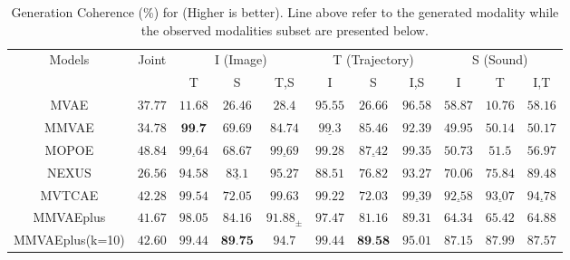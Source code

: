\begin{table}[ht]
\centering
\tiny
\caption{Generation Coherence (\%) for \textbf{\mhd} (Higher is better). Line above refer to the generated modality while the observed modalities subset are presented below.
}  

\begin{tabular}{c|c|ccc|ccc|ccc}
\toprule
\multirow{2}{*}{ Models }  & \multirow{2}{*}{ Joint }  & \multicolumn{3}{c}{I (Image)}  & \multicolumn{3}{c}{T (Trajectory)}  & \multicolumn{3}{c}{S (Sound) } 
\\
\cmidrule{3-11}
    &&  T & S  & T,S  & I & S  & I,S & I & T & I,T \\
    \midrule
    \gls{MVAE} &$37.77$ &
    
    $11.68$ &
    $26.46$ & 
    $ 28.4$ & 
    
    $95.55$  &
    $26.66$ &
     $96.58$ &  
    
    $58.87$ & 
    $10.76$  & 
    $58.16$    \\

     \gls{MMVAE} &    
    $34.78$ &
    
    $\textbf{99.7}$ &
    $69.69 $ & 
    $ 84.74$ & 
    $\underline{99.3}$  &
    $85.46 $  & 
    $92.39$ & 
    $49.95$ & 
    $50.14$  & 
    $50.17$   \\
   
     \gls{MOPOE}   &   $48.84$ &
    $\underline{99.64}$ & $68.67$ & $ \underline{99.69}$ & 
    $99.28$  & $\underline{87.42}$  & $99.35$ &  
    $50.73$ & $51.5$  & $56.97$   \\

     \gls{NEXUS} &  $26.56$ &
    $94.58$ & $\underline{83.1}$ & $ 95.27$ & 
    $88.51$  & $76.82$  & $93.27$ &  
    $70.06$ & $75.84$  & $89.48$ 
    \\
      \gls{MVTCAE} &  $42.28$ 
     &
    $99.54$ & $72.05$ & $ 99.63$ & 
    $99.22$  & $72.03$  & $\underline{99.39}$ &  
    $\underline{92.58}$ & $\underline{93.07}$  & $\underline{94.78}$  \\

 
      \gls{MMVAEplus} &  $41.67$ 
     &
    $98.05$ & $84.16$ & $ 91.88_{\pm }$ & 
    $97.47$  & $81.16$  & $89.31$ &  
    $64.34$ & 
    $65.42$  &
    $64.88$  \\

   \gls{MMVAEplus}(k=10) &  $42.60$ 
     &
    $99.44$ & $\textbf{89.75}$ & $ 94.7$ & 
    $99.44$  
    & $\textbf{89.58}$  & $95.01$ &  
    $87.15$ & 
    $87.99$  &
    $87.57$  
    

\end{tabular}
\end{table}
